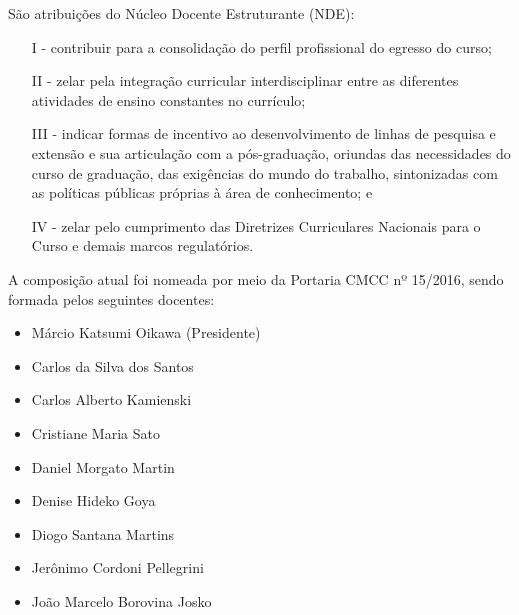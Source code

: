 São atribuições do Núcleo Docente Estruturante (NDE):
\begin{enumerate}
    \item [I -] contribuir para a consolidação do perfil profissional do
    egresso do curso;
    \item [II -] zelar pela integração curricular interdisciplinar entre as
    diferentes atividades de ensino constantes no currículo;
    \item [III -] indicar formas de incentivo ao desenvolvimento de linhas de
    pesquisa e extensão e sua articulação com a pós-graduação, oriundas das
    necessidades do curso de graduação, das exigências do mundo do trabalho,
    sintonizadas com as políticas públicas próprias à área de conhecimento; e
    \item [IV -] zelar pelo cumprimento das Diretrizes Curriculares Nacionais
    para o Curso e demais marcos regulatórios.
\end{enumerate}

A composição atual foi nomeada por meio da Portaria CMCC nº 15/2016, sendo
formada pelos seguintes docentes:
\begin{itemize}
    \item Márcio Katsumi Oikawa (Presidente)
    \item Carlos da Silva dos Santos
    \item Carlos Alberto Kamienski
    \item Cristiane Maria Sato
    \item Daniel Morgato Martin
    \item Denise Hideko Goya
    \item Diogo Santana Martins
    \item Jerônimo Cordoni Pellegrini
    \item João Marcelo Borovina Josko
\end{itemize}
